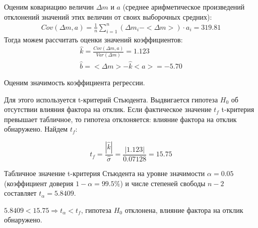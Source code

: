 \documentclass[a4paper,12pt]{report}
\newcommand{\dm}{\Delta{}m}
\newcommand{\dmsr}{<\Delta{}m>}
\begin{document}
Оценим ковариацию величин $\dm$ и $a$ (среднее арифметическое произведений отклонений значений этих величин от своих выборочных средних):
\begin{gather}
	Cov(\dm,a)=\frac{1}{n}\sum\limits_{i=1}^{n}(\dm_i-\dmsr)\cdot{}a_i=319.81
\end{gather}
Тогда можем рассчитать оценки значений коэффициентов:
\begin{gather}
	\hat{k}=\frac{Cov(\dm,a)}{Var(\dm)}=1.123\\
	\hat{b}=\dmsr-\hat{k}<a>=-5.70
\end{gather}





Оценим значимость коэффициента регрессии.

Для этого используется t-критерий Стьюдента. Выдвигается гипотеза $H_0$ об отсутствии 
влияния фактора на отклик. Если фактическое значение  $t_f$ t-критерия превышает табличное, то гипотеза отклоняется: влияние фактора на отклик обнаружено. Найдем $t_f$: 

\begin{equation}
	t_f=\frac{|\hat{k}|}{\hat{\sigma}}=\frac{|1.123|}{0.07128}=15.75
\end{equation}

Табличное значение t-критерия Стьюдента на уровне значимости $\alpha=0.05$ (коэффициент доверия $1-\alpha=99.5\%$) и числе степеней свободы $n-2$ составляет $t_\alpha=5.8409$.

$5.8409<15.75 \Longrightarrow t_\alpha<t_f$, гипотеза $H_0$ отклонена, влияние фактора на отклик обнаружено.
\end{document}
